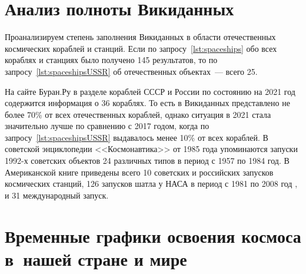 \section{Анализ полноты Викиданных}

Проанализируем степень заполнения Викиданных в области отечественных космических кораблей и станций. 
Если по запросу~\ref{lst:spaceships} обо всех кораблях и станциях было получено 145 результатов, 
то по запросу~\ref{lst:spaceshipsUSSR} об отечественных объектах~--- всего 25. 

На сайте Буран.Ру в разделе кораблей СССР и России по состоянию на 2021 год содержится информация о 36 кораблях\autocite{spacecraftBuran}. То есть в Викиданных представлено не более 70\% от всех отечественных кораблей, однако ситуация в 2021 стала значительно лучше по сравнению с 2017 годом, когда по запросу~\ref{lst:spaceshipsUSSR} выдавалось менее 10\% от всех кораблей. 
В советской энциклопедии <<Космонавтика>> от 1985 года упоминаются запуски 1992-х советских объектов 24 различных типов в период с 1957 по 1984 год\autocite[~498]{spacecraftCosmonavtika}. 
В Американской книге приведены всего 10 советских и российских запусков космических станций\autocite[~296]{spacecraftSAA}, 126 запусков шатла у НАСА в период с 1981 по 2008 год \autocite[~288]{spacecraftSAA}, и 31 международный запуск\autocite[~290---291]{spacecraftSAA}. 

\section{Временные графики освоения космоса в~нашей стране и мире}

